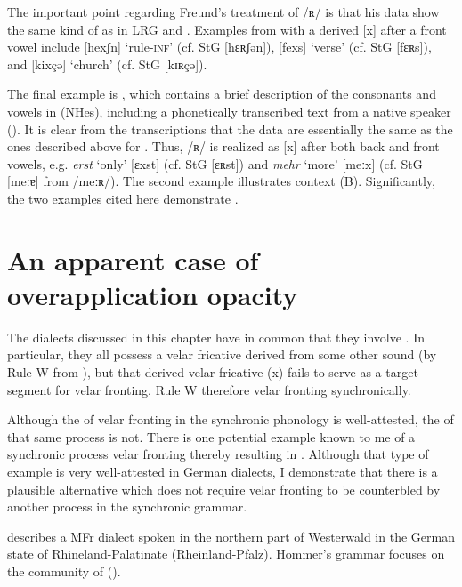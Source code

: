 The important point regarding Freund’s treatment of  /ʀ/ is that his data show the same kind of   as in LRG and . Examples from \citet[97]{Freund1910} with a derived [x] after a front vowel include [hexʃn] ‘rule-\textsc{inf}’ (cf. StG [hɛʀʃən]), [fexs] ‘verse’ (cf. StG [fɛʀs]), and [kixçə] ‘church’ (cf. StG [kɪʀçə]).\largerpage

The final example is \citet{Müller1958b}, which contains a brief description of the consonants and vowels in  (NHes), including a phonetically transcribed text from a native speaker (). It is clear from the transcriptions that the data are essentially the same as the ones described above for . Thus, /ʀ/ is realized as [x] after both back and front vowels, e.g. \textit{erst} ‘only’ [ɛxst] (cf. StG [ɛʀst]) and \textit{mehr} ‘more’ [meːx] (cf. StG [meːɐ] from /meːʀ/). The second example illustrates context (B). Significantly, the two examples cited here demonstrate .

\section{{An} {apparent} {case} {of} {overapplication} {opacity}}\label{sec:5.4}

The dialects discussed in this chapter have in common that they involve . In particular, they all possess a velar fricative derived from some other sound (by Rule W from ), but that derived velar fricative ({\textbar}x{\textbar}) fails to serve as a target segment for velar fronting. Rule W therefore  velar fronting synchronically.

Although the  of velar fronting in the synchronic phonology is well-attested, the  of that same process is not. There is one potential example known to me of a synchronic process  velar fronting thereby resulting in  . Although that type of example is very well-attested in German dialects, I demonstrate that there is a plausible alternative which does not require velar fronting to be counterbled by another process in the synchronic grammar.

\citet{Hommer1910} describes a MFr dialect spoken in the northern part of Westerwald in the German state of Rhineland-Palatinate (Rheinland-Pfalz). Hommer’s grammar focuses on the community of  ().


